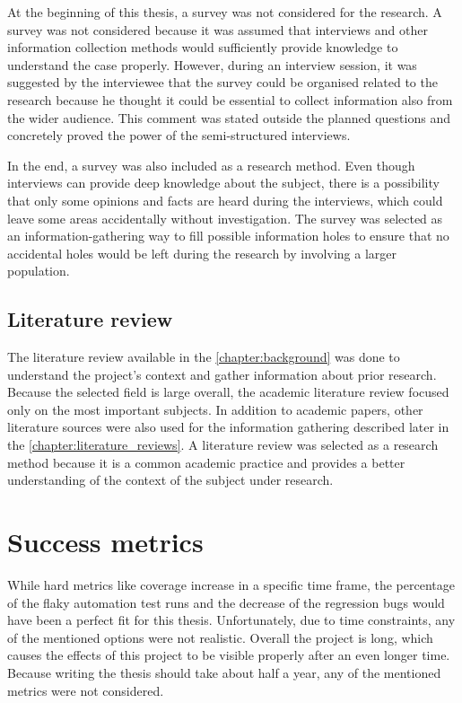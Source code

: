 At the beginning of this thesis, a survey was not considered for the research. A survey was not considered because it was assumed that interviews and other information collection methods would sufficiently provide knowledge to understand the case properly. However, during an interview session, it was suggested by the interviewee that the survey could be organised related to the research because he thought it could be essential to collect information also from the wider audience. This comment was stated outside the planned questions and concretely proved the power of the semi-structured interviews.

In the end, a survey was also included as a research method. Even though interviews can provide deep knowledge about the subject, there is a possibility that only some opinions and facts are heard during the interviews, which could leave some areas accidentally without investigation. The survey was selected as an information-gathering way to fill possible information holes to ensure that no accidental holes would be left during the research by involving a larger population.

\subsection{Literature review}\label{subsection:literature_review}
The literature review available in the \autoref{chapter:background} was done to understand the project's context and gather information about prior research. Because the selected field is large overall, the academic literature review focused only on the most important subjects. In addition to academic papers, other literature sources were also used for the information gathering described later in the \autoref{chapter:literature_reviews}. A literature review was selected as a research method because it is a common academic practice and provides a better understanding of the context of the subject under research.

\section{Success metrics}\label{success_metrics}
While hard metrics like coverage increase in a specific time frame, the percentage of the flaky automation test runs and the decrease of the regression bugs would have been a perfect fit for this thesis. Unfortunately, due to time constraints, any of the mentioned options were not realistic. Overall the project is long, which causes the effects of this project to be visible properly after an even longer time. Because writing the thesis should take about half a year, any of the mentioned metrics were not considered.

